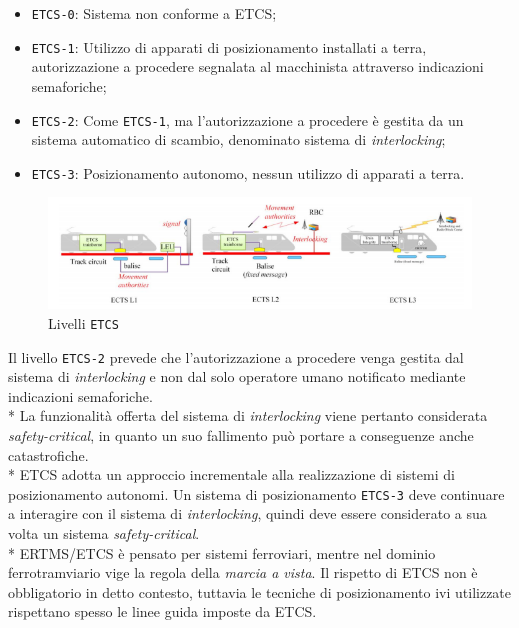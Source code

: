 \begin{itemize}
	\item \texttt{ETCS-0}: Sistema non conforme a ETCS;
	\item \texttt{ETCS-1}: Utilizzo di apparati di posizionamento installati a terra, autorizzazione a procedere segnalata al macchinista attraverso indicazioni semaforiche;
	\item \texttt{ETCS-2}: Come \texttt{ETCS-1}, ma l'autorizzazione a procedere \`e gestita da un sistema automatico di scambio, denominato sistema di \emph{interlocking}; \cite{interlocking}
	\item \texttt{ETCS-3}: Posizionamento autonomo, nessun utilizzo di apparati a terra.
\end{itemize}
\begin{figure}[h]
	\centering
	\includegraphics[width=\linewidth]{img/etcs123.png}
	\caption{Livelli \texttt{ETCS}}
	\label{fig:etcs123}
\end{figure}
Il livello \texttt{ETCS-2} prevede che l'autorizzazione a procedere venga gestita dal sistema di \emph{interlocking} e non dal solo operatore umano notificato mediante indicazioni semaforiche.\\*
La funzionalit\`a offerta del sistema di \emph{interlocking} viene pertanto considerata \emph{safety-critical}, in quanto un suo fallimento pu\`o portare a conseguenze anche catastrofiche. \cite{marocchini}\\*
ETCS adotta un approccio incrementale alla realizzazione di sistemi di posizionamento autonomi. Un sistema di posizionamento \texttt{ETCS-3} deve continuare a interagire con il sistema di \emph{interlocking}, quindi deve essere considerato a sua volta un sistema \emph{safety-critical}.\\*
ERTMS/ETCS \`e pensato per sistemi ferroviari, mentre nel dominio ferrotramviario vige la regola della \emph{marcia a vista}. Il rispetto di ETCS non \`e obbligatorio in detto contesto, tuttavia le tecniche di posizionamento ivi utilizzate rispettano spesso le linee guida imposte da ETCS. 
